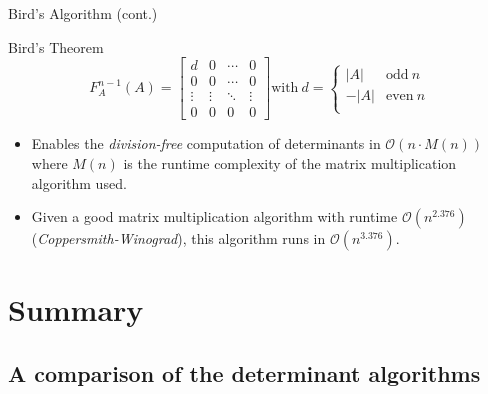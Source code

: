 \documentclass{beamer}
\begin{document}
\begin{frame}{Bird's Algorithm (cont.)}

    \begin{block}{Bird's Theorem}
        \[
            F_A^{n-1}(A) =
            \begin{bmatrix}{}
                d      & 0      & \cdots & 0 \\
                0      & 0      & \cdots & 0 \\
                \vdots & \vdots & \ddots & \vdots \\
                0      & 0      & 0      & 0
            \end{bmatrix}
            \text{with} \ d =
            \begin{cases}{}
                |A|  & \text{odd} \ n \\
                -|A| & \text{even} \ n \\
            \end{cases}
        \]
    \end{block}

    \begin{itemize}

        \item Enables the \emph{division-free} computation of determinants in $\mathcal{O}(n\cdot M(n))$
            where $M(n)$ is the runtime complexity of the matrix multiplication algorithm used.

        \item Given a good matrix multiplication algorithm with runtime $\mathcal{O}(n^{2.376})$
            (\emph{Coppersmith-Winograd}),
            this algorithm runs in $\mathcal{O}(n^{3.376})$.

    \end{itemize}

\end{frame}

\section{Summary}

\subsection{A comparison of the determinant algorithms}
\end{document}
